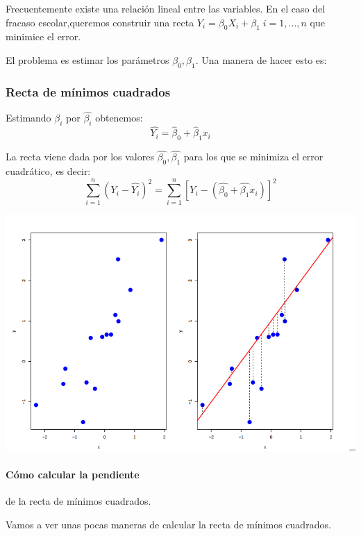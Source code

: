 Frecuentemente existe una relación lineal entre las variables. En el caso del fracaso escolar,queremos construir una recta $Y_i = β_0 X_i + β_1\; i=1,...,n$ que minimice el error.

El problema es estimar los parámetros $β_0,β_1$. Una manera de hacer esto es:

\subsubsection{Recta de mínimos cuadrados}

\begin{defn}
Estimando $β_i$ por $\hat{β_i}$ obtenemos: \[\hat{Y_i} = \hat{β}_0 + \hat{β}_1 x_i\]

La recta viene dada por los valores $\hat{β_0}, \hat{β_1}$ para los que se minimiza el error cuadrático, es decir:
\[\sum_{i=1}^n \left(Y_i - \hat{Y_i}\right)^2 =  \sum_{i=1}^n \left[ Y_i - (\hat{β_0} + \hat{β_1}x_i) \right]^2\]
\end{defn}

\begin{example}
\begin{center}
\includegraphics[scale = 0.6]{img/ejemploRectaRegresionLineal.png}
\end{center}
\end{example}

\paragraph{Cómo calcular la pendiente} de la recta de mínimos cuadrados.


Vamos a ver unas pocas maneras de calcular la recta de mínimos cuadrados.

